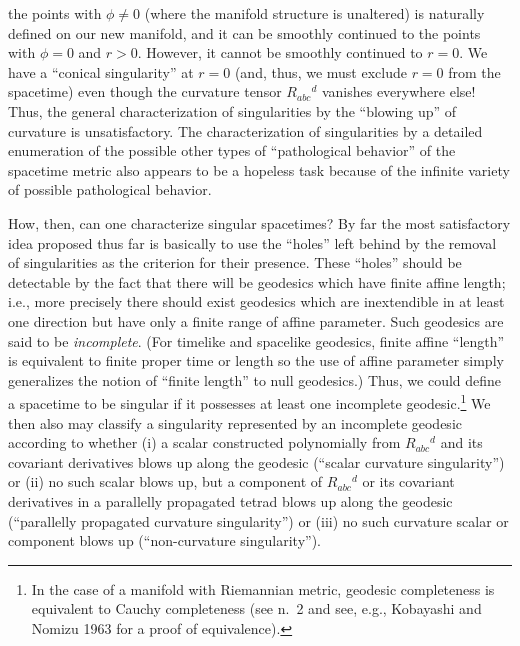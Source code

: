 the points with \(\phi\ne0\) (where the manifold structure is unaltered) is naturally
defined on our new manifold, and it can be smoothly continued to the points with
\(\phi=0\) and \(r>0\). However, it cannot be smoothly continued to \(r=0\). We have a
``conical singularity'' at \(r=0\) (and, thus, we must exclude \(r=0\) from the spacetime)
even though the curvature tensor \(R_{abc}{}^d\) vanishes everywhere else! Thus, the
general characterization of singularities by the ``blowing up'' of curvature is
unsatisfactory. The characterization of singularities by a detailed enumeration of
the possible other types of ``pathological behavior'' of the spacetime metric also
appears to be a hopeless task because of the infinite variety of possible pathological
behavior.


How, then, can one characterize singular spacetimes? By far the most satisfactory
idea proposed thus far is basically to use the ``holes'' left behind by the removal of
singularities as the criterion for their presence. These ``holes'' should be detectable
by the fact that there will be geodesics which have finite affine length; i.e., more
precisely there should exist geodesics which are inextendible in at least one direction
but have only a finite range of affine parameter. Such geodesics are said to be
\emph{incomplete}. (For timelike and spacelike geodesics, finite affine ``length'' is equivalent
to finite proper time or length so the use of affine parameter simply generalizes the
notion of ``finite length'' to null geodesics.) Thus, we could define a spacetime to be
singular if it possesses at least one incomplete geodesic.\footnote{In the case of a manifold with Riemannian metric, geodesic completeness is equivalent to Cauchy
completeness (see n.~2 and see, e.g., Kobayashi and Nomizu 1963 for a proof of equivalence).}
We then also may classify a singularity represented by an incomplete geodesic
according to whether (i) a scalar constructed polynomially from \(R_{abc}{}^d\) and its
covariant derivatives blows up along the geodesic (``scalar curvature singularity'') or
(ii) no such scalar blows up, but a component of \(R_{abc}{}^d\) or its covariant
derivatives in a parallelly propagated tetrad blows up along the geodesic (``parallelly
propagated curvature singularity'') or (iii) no such curvature scalar or component
blows up (``non-curvature singularity'').

